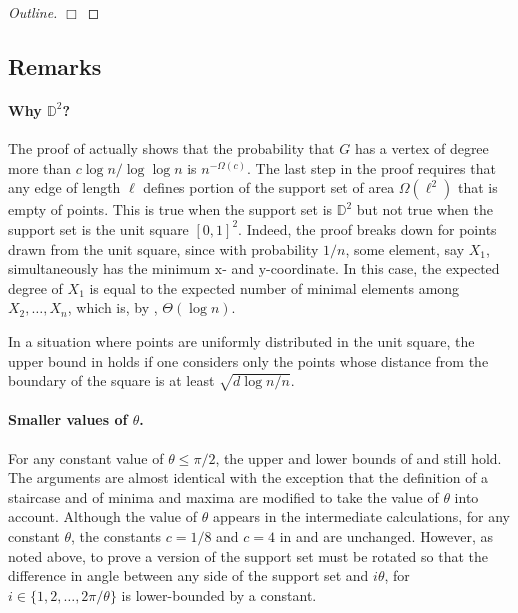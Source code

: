 \documentclass[10pt]{llncs}
\newcommand{\D}{\mathbb{D}}
\begin{document}
\begin{proof}[Outline]
%
%
\hfill$\Box$\end{proof}

\subsection{Remarks}

\paragraph{Why $\D^2$?} 
The proof of  actually shows that the
probability that $G$ has a vertex of degree more than $c\log n/\log\log n$
is $n^{-\Omega(c)}$.  The last step in the proof requires that any edge of
length $\ell$ defines portion of the support set of area $\Omega(\ell^2)$
that is empty of points.  This is true when the support set is $\D^2$
but not true when the support set is the unit square $[0,1]^2$.
Indeed, the proof breaks down for points drawn from the unit square,
since with probability $1/n$, some element, say $X_1$, simultaneously
has the minimum $\mathrm x$- and $\mathrm y$-coordinate.  In this case,
the expected degree of $X_1$ is equal to the expected number of minimal
elements among $X_2,\ldots,X_n$, which is, by , $\Theta(\log n)$.

In a situation where points are uniformly distributed in the unit square,
the upper bound in  holds if one considers only
the points whose distance from the boundary of the square is at least
$\sqrt{d\log n/n}$.

\paragraph{Smaller values of $\theta$.}
For any constant value of $\theta \le \pi /2$, the upper and lower bounds
of  and 
still hold.  The arguments are almost identical with the exception that
the definition of a staircase and of minima and maxima are modified to
take the value of $\theta$ into account.  Although the value of $\theta$
appears in the intermediate calculations, for any constant $\theta$,
the constants $c=1/8$ and $c=4$ in 
and  are unchanged.  However, as noted above,
to prove a version of  the support set
must be rotated so that the difference in angle between any side of the
support set and $i\theta$, for $i\in\{1,2,\ldots,2\pi/\theta\}$ is lower-bounded
by a constant.
\end{document}
